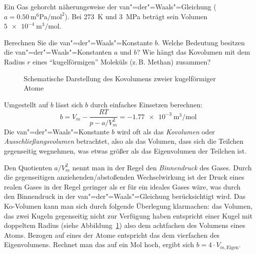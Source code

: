 \documentclass[DIV11]{scrartcl}
\begin{document}
\begin{question}[name=Van-der-Waalssche Zustandsgleichung II,ID=vdW:2]
Ein Gas gehorcht näherungsweise der van"=der"=Waals"=Gleichung ($a =
\SI{0.50}{\metre\tothe{6}\pascal\per\mol\squared}$).  Bei \SI{273}{\kelvin} und
\SI{3}{\mega\pascal} beträgt sein Volumen $\SI{5e-4}{\metre\cubed\per\mole}$.
\begin{tasks}
  \task Berechnen Sie die van"=der"=Waals"=Konstante $b$.
  \task Welche Bedeutung besitzen die van"=der"=Waals"=Konstanten $a$ und $b$?
  \task Wie hängt das Kovolumen mit dem Radius $r$ eines "`kugelförmigen"'
    Moleküls (z.\,B. Methan) zusammen?
\end{tasks}
\end{question}
\begin{solution}[name=Van-der-Waalssche Zustandsgleichung II]
  \begin{figure}
    \centering
    \caption{Schematische Darstellung des Kovolumens zweier kugelförmiger
      Atome}\label{fig:kovolumen}
  \end{figure}
  \begin{tasks}
    \task Umgestellt auf $b$ lässt sich $b$ durch einfaches Einsetzen
      berechnen:
      \[
        b = V_m - \frac{RT}{p-a/V_m^2}
          = \SI{-1.77e-3}{\metre\cubed\per\mole}
      \]
    \task Die van"=der"=Waals"=Konstante $b$ wird oft als das \emph{Kovolumen}
      oder \emph{Ausschließungsvolumen} betrachtet, also als das Volumen, dass
      sich die Teilchen gegenseitig wegnehmen, was etwas größer als das
      Eigenvolumen der Teilchen ist.

      Den Quotienten $a/V_m^2$ nennt man in der Regel den \emph{Binnendruck}
      des Gases.  Durch die gegenseitigen anziehenden/abstoßenden
      Wechselwirkung ist der Druck eines realen Gases in der Regel geringer
      als er für ein ideales Gases wäre, was durch den Binnendruck in der
      van"=der"=Waals"=Gleichung berücksichtigt wird.
    \task Das Ko-Volumen kann man sich durch folgende Überlegung klarmachen:
      das Volumen, das zwei Kugeln gegenseitig nicht zur Verfügung haben
      entspricht einer Kugel mit doppeltem Radius (siehe
      Abbildung~\ref{fig:kovolumen}) also dem achtfachen des Volumens eines
      Atoms.  Bezogen auf eines der Atome entspricht  das dem vierfachen des
      Eigenvolumens.  Rechnet man das auf ein Mol hoch, ergibt sich  $b =
      4\cdot V_{m,\text{Eigen}}$.
  \end{tasks}
\end{solution}
\end{document}

